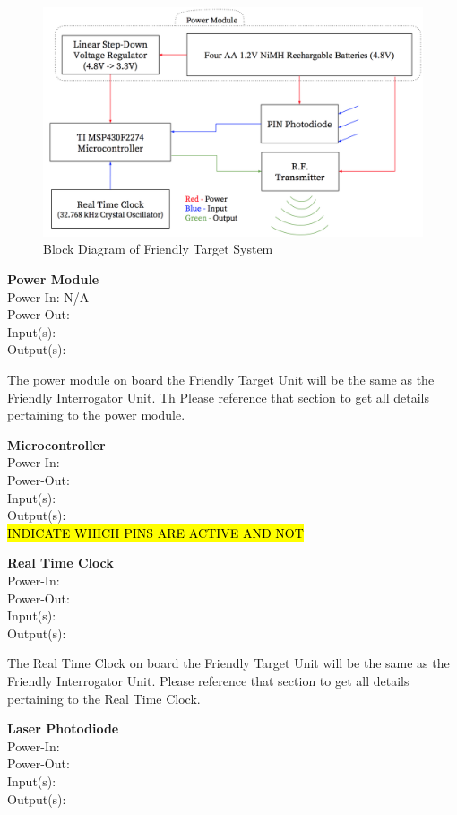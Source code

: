\documentclass[letterpaper,10pt]{article}
\begin{document}
\begin{spacing}{1.15}
\begin{figure} [H]
	\centering
	\includegraphics[scale=0.50]{Friendly_Target_Block_Diagram.png}
	\caption{Block Diagram of Friendly Target System\label{fig:friendly-target-block}}
\end{figure}

\normalsize\textbf{Power Module} \\
Power-In: N/A\\
Power-Out: \\
Input(s): \\
Output(s):

The power module on board the Friendly Target Unit will be the same as the Friendly Interrogator Unit. Th Please reference that section to get all details pertaining to the power module.


\normalsize\textbf{Microcontroller} \\
Power-In: \\
Power-Out:\\
Input(s):\\
Output(s):\\
\hl{INDICATE WHICH PINS ARE ACTIVE AND NOT}

\normalsize\textbf{Real Time Clock} \\
Power-In: \\
Power-Out: \\
Input(s): \\
Output(s):

The Real Time Clock on board the Friendly Target Unit will be the same as the Friendly Interrogator Unit. Please reference that section to get all details pertaining to the Real Time Clock.

\normalsize\textbf{Laser Photodiode}\\
Power-In: \\
Power-Out: \\
Input(s): \\
Output(s):


\end{spacing}
\end{document}
